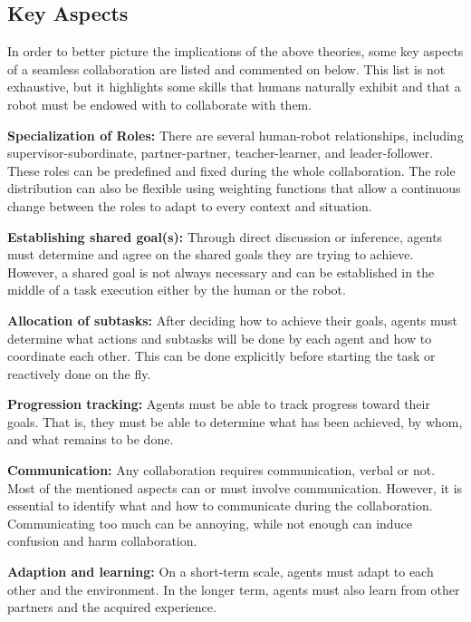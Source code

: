 \subsection{Key Aspects}


In order to better picture the implications of the above theories, some key aspects of a seamless collaboration are listed and commented on below. This list is not exhaustive, but it highlights some skills that humans naturally exhibit and that a robot must be endowed with to collaborate with them. 

\textbf{Specialization of Roles:} There are several human-robot relationships, including supervisor-subordinate, partner-partner, teacher-learner, and leader-follower. These roles can be predefined and fixed during the whole collaboration. The role distribution can also be flexible using weighting functions that allow a continuous change between the roles to adapt to every context and situation.

\textbf{Establishing shared goal(s):} Through direct discussion or inference, agents must determine and agree on the shared goals they are trying to achieve. However, a shared goal is not always necessary and can be established in the middle of a task execution either by the human or the robot.

\textbf{Allocation of subtasks:} After deciding how to achieve their goals, agents must determine what actions and subtasks will be done by each agent and how to coordinate each other. This can be done explicitly before starting the task or reactively done on the fly.

\textbf{Progression tracking:} Agents must be able to track progress toward their goals. That is, they must be able to determine what has been achieved, by whom, and what remains to be done. 

\textbf{Communication:} Any collaboration requires communication, verbal or not. Most of the mentioned aspects can or must involve communication. However, it is essential to identify what and how to communicate during the collaboration. Communicating too much can be annoying, while not enough can induce confusion and harm collaboration.

\textbf{Adaption and learning:} On a short-term scale, agents must adapt to each other and the environment. In the longer term, agents must also learn from other partners and the acquired experience.

